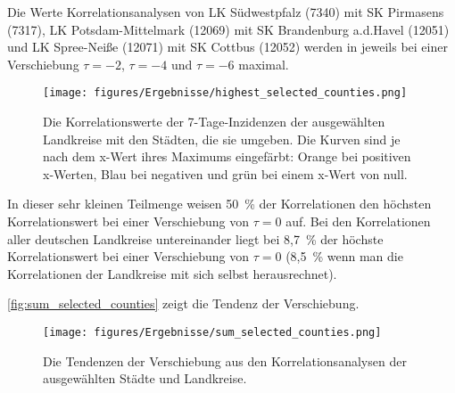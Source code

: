 Die Werte Korrelationsanalysen von LK Südwestpfalz (7340) mit SK Pirmasens (7317), LK Potsdam-Mittelmark (12069) mit SK Brandenburg a.d.Havel (12051) und LK Spree-Neiße (12071) mit SK Cottbus (12052) werden in jeweils bei einer Verschiebung $\tau=-2$, $\tau=-4$ und $\tau=-6$ maximal.
\begin{figure}[H]
    \centering
    \texttt{[image: figures/Ergebnisse/highest\_selected\_counties.png]}
    \caption{Die Korrelationswerte der 7-Tage-Inzidenzen der ausgewählten Landkreise mit den Städten, die sie umgeben. Die Kurven sind je nach dem x-Wert ihres Maximums eingefärbt: Orange bei positiven x-Werten, Blau bei negativen und grün bei einem x-Wert von null.}
    \label{fig:highest_selected_counties}
\end{figure}

In dieser sehr kleinen Teilmenge weisen 50~\% der Korrelationen den höchsten Korrelationswert bei einer Verschiebung von $\tau = 0$ auf.
Bei den Korrelationen aller deutschen Landkreise untereinander liegt bei 8,7~\% der höchste Korrelationswert bei einer Verschiebung von $\tau= 0$ (8,5~\% wenn man die Korrelationen der Landkreise mit sich selbst herausrechnet).

\autoref{fig:sum_selected_counties} zeigt die Tendenz der Verschiebung.
\begin{figure}
    \centering
    \texttt{[image: figures/Ergebnisse/sum\_selected\_counties.png]}
    \caption{Die Tendenzen der Verschiebung aus den Korrelationsanalysen der ausgewählten Städte und Landkreise.}
    \label{fig:sum_selected_counties}
\end{figure}